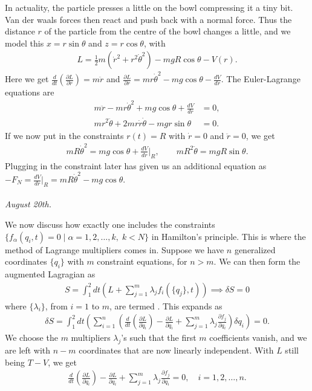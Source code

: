 In actuality, the particle presses a little on the bowl compressing it a tiny bit. Van der waals forces then react and push back with a normal force. Thus the distance $r$ of the particle from the centre of the bowl changes a little, and we model this $x = r \sin \theta$ and $z = r \cos \theta$, with
\begin{align}
    L = \frac{1}{2}m(\dot{r}^{2} + r^{2} \dot{\theta}^{2}) - mgR \cos \theta - V(r).
\end{align}
Here we get $\frac{d}{dt} \left( \frac{\partial L}{\partial \dot{r}} \right) = m\ddot{r}$ and $\frac{\partial L}{\partial r} = mr\dot{\theta}^{2} - mg\cos\theta - \frac{dV}{dr}$. The Euler-Lagrange equations are
\begin{align}
    m\ddot{r} - mr\dot{\theta}^{2} + mg\cos\theta + \frac{dV}{dr} &= 0,\\
    mr^{2}\ddot{\theta} + 2mr\dot{r}\dot{\theta} - mgr \sin \theta &= 0.
\end{align}
If we now put in the constraints $r(t) = R$ with $\dot{r} = 0$ and $\ddot{r} = 0$, we get
\begin{align}
    mR \dot{\theta}^{2} = mg \cos \theta + \frac{dV}{dr} \bigg|_{R}, \qquad mR^{2}\ddot{\theta} = mgR \sin \theta.
\end{align}
Plugging in the constraint later has given us an additional equation as $- F_{N} = \frac{dV}{dr} \big|_{R} = mR\dot{\theta}^{2} - mg \cos \theta$.\\ \\
\textit{August 20th.}

We now discuss how exactly one includes the constraints $\{f_{\alpha}(q_{i},t) = 0 \mid \alpha = 1,2,\ldots,k,\; k < N\}$ in Hamilton's principle. This is where the method of Lagrange multipliers comes in. Suppose we have $n$ generalized coordinates $\{q_{i}\}$ with $m$ constraint equations, for $n > m$. We can then form the augmented Lagragian as
\begin{align}
    S = \int_{1}^{2} dt \left( L + \sum_{j=1}^{m} \lambda_{j}f_{i}(\{q_{j}\},t) \right) \implies \delta S = 0
\end{align}
where $\{\lambda_{i}\}$, from $i = 1$ to $m$, are termed . This expands as
\begin{align}
    \delta S = \int_{1}^{2} dt \left( \sum_{i=1}^{n} \left( \frac{d}{dt} \left( \frac{\partial L}{\partial \dot{q}_{i}} \right) - \frac{\partial L}{\partial q_{i}} + \sum_{j=1}^{m} \lambda_{j} \frac{\partial f_{j}}{\partial q_{i}} \right) \delta q_{i} \right) = 0.
\end{align}
We choose the $m$ multipliers $\lambda_{j}$'s such that the first $m$ coefficients vanish, and we are left with $n-m$ coordinates that are now linearly independent. With $L$ still being $T-V$, we get
\begin{align}
    \frac{d}{dt}\left( \frac{\partial L}{\partial \dot{q}_{i}} \right) - \frac{\partial L}{\partial q_{i}} + \sum_{j=1}^{m} \lambda_{j} \frac{\partial f_{j}}{\partial q_{i}} = 0, \quad i = 1,2,\ldots,n.
\end{align}

